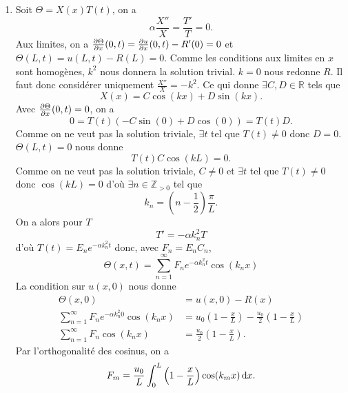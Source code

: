 {\begin{enumerate}
      Un temps court est un temps pour lequel,
      la solution transitoire $\Theta$
      est encore loin d'être négligeable, c'est à dire que
      $t < \frac{\alpha}{L^2}$.
    \item Soit $\Theta = X(x) T(t)$, on a
      \[ \alpha \frac{X''}{X} = \frac{T'}{T} = 0. \]
      Aux limites, on a $\frac{\partial \Theta}{\partial x}(0,t) = \frac{\partial u}{\partial x}(0,t) -
      R'(0) = 0$ et $\Theta(L,t) = u(L,t) - R(L) = 0$.
      Comme les conditions aux limites en $x$ sont homogènes,
      $k^2$ nous donnera la solution trivial. $k = 0$ nous redonne $R$.
      Il faut donc considérer uniquement $\frac{X''}{X} = -k^2$.
      Ce qui donne $\exists C, D \in \mathbb{R}$ tels que
      \[ X(x) = C\cos(kx) + D\sin(kx). \]
      Avec $\frac{\partial \Theta}{\partial x}(0,t) = 0$, on a
      \[ 0 = T(t)(-C\sin(0) + D\cos(0)) = T(t)D. \]
      Comme on ne veut pas la solution triviale, $\exists t$ tel que
      $T(t) \neq 0$ donc $D = 0$.
      $\Theta(L,t) = 0$ nous donne
      \[ T(t)C\cos(kL) = 0. \]
      Comme on ne veut pas la solution triviale, $C \neq 0$ et
      $\exists t$ tel que $T(t) \neq 0$ donc $\cos(kL) = 0$ d'où
      $\exists n \in \mathbb{Z}_{>0}$ tel que
      \[ k_n = \left(n-\frac{1}{2}\right)\frac{\pi}{L}. \]
      On a alors pour $T$
      \[ T' = -\alpha k_n^2 T \]
      d'où $T(t) = E_ne^{-\alpha k_n^2 t}$ donc, avec $F_n = E_nC_n$,
      \[ \Theta(x,t) = \sum_{n=1}^\infty F_ne^{-\alpha k_n^2 t}
      \cos(k_nx) \]
      La condition sur $u(x,0)$ nous donne
      \begin{align*}
        \Theta(x,0) & = u(x,0) - R(x)\\
        \sum_{n=1}^\infty F_ne^{-\alpha k_n^2 0} \cos(k_nx)
        & = u_0\left(1-\frac{x}{L}\right) -
        \frac{u_0}{2}\left(1-\frac{x}{L}\right)\\
        \sum_{n=1}^\infty F_n \cos(k_nx)
        & = \frac{u_0}{2}\left(1-\frac{x}{L}\right).
      \end{align*}
      Par l'orthogonalité des cosinus, on a
      \[ F_m
        = \frac{u_0}{L}\int_0^L \left(1-\frac{x}{L}\right) \cos(k_m x)
      \operatorname{d}\! x. \]
  \end{enumerate}
}


